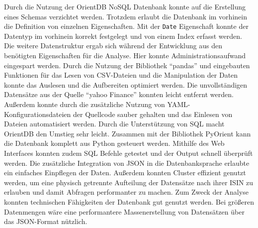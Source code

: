 Durch die Nutzung der OrientDB NoSQL Datenbank konnte auf die Erstellung eines Schemas verzichtet werden. Trotzdem erlaubt die Datenbank im vorhinein die Definition von einzelnen Eigenschaften. Mit der \texttt{Date} Eigenschaft konnte der Datentyp im vorhinein korrekt festgelegt und von einem Index erfasst werden. Die weitere Datenstruktur ergab sich während der Entwicklung aus den benötigten Eigenschaften für die Analyse. Hier konnte Administrationsaufwand eingespart werden. Durch die Nutzung der Bibliothek \enquote{pandas} und eingebauten Funktionen für das Lesen von \gls{CSV}-Dateien und die Manipulation der Daten konnte das Auslesen und die Aufbereiten optimiert werden. Die unvollständigen Datensätze aus der Quelle \enquote{yahoo Finance} konnten leicht entfernt werden. Außerdem konnte durch die zusätzliche Nutzung von \gls{YAML}-Konfigurationsdateien der Quellcode sauber gehalten und das Einlesen von Dateien automatisiert werden. Durch die Unterstützung von \gls{SQL} macht OrientDB den Umstieg sehr leicht. Zusammen mit der Bibliothek PyOrient kann die Datenbank komplett aus Python gesteuert werden. Mithilfe des Web Interfaces konnten zudem \gls{SQL} Befehle getestet und der Output schnell überprüft werden. Die zusätzliche Integration von \gls{JSON} in die Datenbanksprache erlaubte ein einfaches Einpflegen der Daten. Außerdem konnten Cluster effizient genutzt werden, um eine physisch getrennte Aufteilung der Datensätze nach ihrer \gls{ISIN} zu erlauben und damit Abfragen performanter zu machen. Zum Zweck der Analyse konnten technischen Fähigkeiten der Datenbank gut genutzt werden. Bei größeren Datenmengen wäre eine performantere Massenerstellung von Datensätzen über das \gls{JSON}-Format nützlich.


\clearpage